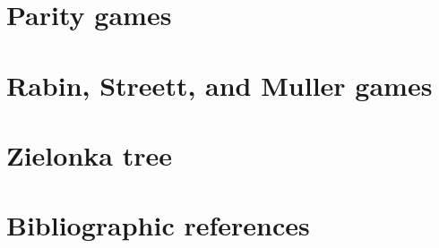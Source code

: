 \section{Parity games}
\label{2-sec:parity}



\section{Rabin, Streett, and Muller games}
\label{2-sec:muller}



\section{Zielonka tree}
\label{2-sec:zielonka}



\section*{Bibliographic references}
\label{2-sec:references}




